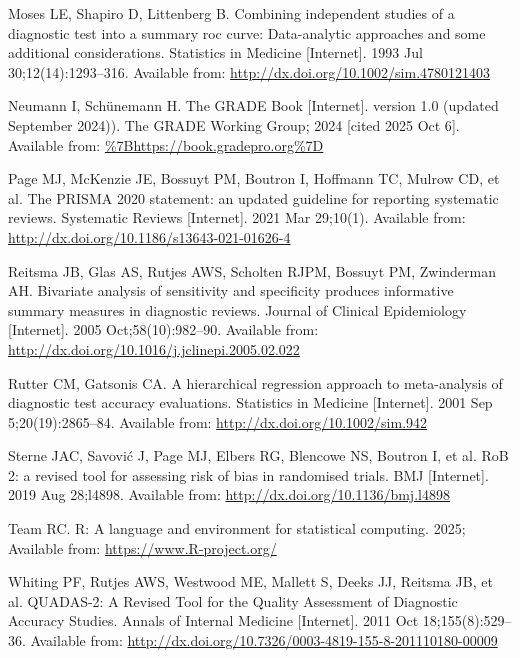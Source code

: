 \documentclass[
  11pt,
  a4paper,
  DIV=11,
  numbers=noendperiod]{scrreprt}
\newlength{\cslhangindent}
\newenvironment{CSLReferences}[2] %
 {\begin{list}{}{%
  \setlength{\itemindent}{0pt}
  \setlength{\leftmargin}{0pt}
  \setlength{\parsep}{0pt}
  \ifodd #1
   \setlength{\leftmargin}{\cslhangindent}
   \setlength{\itemindent}{-1\cslhangindent}
  \fi
  \setlength{\itemsep}{#2\baselineskip}}}
 {\end{list}}
\begin{document}
\begin{CSLReferences}{1}{1}
Moses LE, Shapiro D, Littenberg B. Combining independent studies of a
diagnostic test into a summary roc curve: Data{-}analytic approaches and
some additional considerations. Statistics in Medicine {[}Internet{]}.
1993 Jul 30;12(14):1293--316. Available from:
\url{http://dx.doi.org/10.1002/sim.4780121403}

Neumann I, Schünemann H. {The GRADE Book} {[}Internet{]}. version 1.0
(updated September 2024)). The GRADE Working Group; 2024 {[}cited 2025
Oct 6{]}. Available from: \url{\%7Bhttps://book.gradepro.org\%7D}

Page MJ, McKenzie JE, Bossuyt PM, Boutron I, Hoffmann TC, Mulrow CD, et
al. The PRISMA 2020 statement: an updated guideline for reporting
systematic reviews. Systematic Reviews {[}Internet{]}. 2021 Mar
29;10(1). Available from:
\url{http://dx.doi.org/10.1186/s13643-021-01626-4}

Reitsma JB, Glas AS, Rutjes AWS, Scholten RJPM, Bossuyt PM, Zwinderman
AH. Bivariate analysis of sensitivity and specificity produces
informative summary measures in diagnostic reviews. Journal of Clinical
Epidemiology {[}Internet{]}. 2005 Oct;58(10):982--90. Available from:
\url{http://dx.doi.org/10.1016/j.jclinepi.2005.02.022}

Rutter CM, Gatsonis CA. A hierarchical regression approach to
meta{-}analysis of diagnostic test accuracy evaluations. Statistics in
Medicine {[}Internet{]}. 2001 Sep 5;20(19):2865--84. Available from:
\url{http://dx.doi.org/10.1002/sim.942}

Sterne JAC, Savović J, Page MJ, Elbers RG, Blencowe NS, Boutron I, et
al. RoB 2: a revised tool for assessing risk of bias in randomised
trials. BMJ {[}Internet{]}. 2019 Aug 28;l4898. Available from:
\url{http://dx.doi.org/10.1136/bmj.l4898}

Team RC. R: A language and environment for statistical computing. 2025;
Available from: \url{https://www.R-project.org/}

Whiting PF, Rutjes AWS, Westwood ME, Mallett S, Deeks JJ, Reitsma JB, et
al. QUADAS-2: A Revised Tool for the Quality Assessment of Diagnostic
Accuracy Studies. Annals of Internal Medicine {[}Internet{]}. 2011 Oct
18;155(8):529--36. Available from:
\url{http://dx.doi.org/10.7326/0003-4819-155-8-201110180-00009}

\end{CSLReferences}
\end{document}
